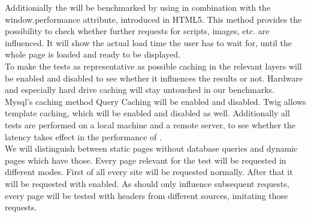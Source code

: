 Additionially the \webApplication{} will be benchmarked by using \selenium{} in combination with the window.performance attribute, introduced in HTML5.
This method provides the possibility to check whether further requests for scripts, images, etc. are influenced.
It will show the actual load time the user has to wait for, until the whole page is loaded and ready to be displayed.
\\
To make the tests as representative as possible caching in the relevant layers will be enabled and disabled to see whether it influences the results or not.
Hardware and especially hard drive caching will stay untouched in our benchmarks.
\\
Mysql's caching method Query Caching will be enabled and disabled.
Twig allows template caching, which will be enabled and disabled as well.
Additionally all tests are performed on a local machine and a remote server, to see whether the latency takes effect in the performance of \lare{}.
\\
We will distinguish between static pages without database queries and dynamic pages which have those.
Every page relevant for the test will be requested in different modes.
First of all every site will be requested normally.
After that it will be requested with \lare{} enabled.
As \lare{} should only influence subsequent requests, every page will be tested with \http{} headers from different sources, imitating those requests.

%
%
%



